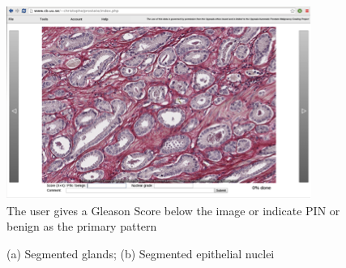 \documentclass[10pt, a4paper]{article}
\begin{document}
{\begin{enumerate}
\begin{figure}[!htbp]
	\centering
	\includegraphics[width=.6\textwidth]{figures/research/userinterfaceprostate.png}
	\caption{The user gives a Gleason Score below the image or indicate PIN or benign as the primary pattern} 
	\label{fig:userintpros}
\end{figure}

\begin{figure}[!htbp]
	\centering
	\caption{(a) Segmented glands; (b) Segmented epithelial nuclei}
	\label{fig:segglandpros}
\end{figure}


\newpage




\end{enumerate}}
\end{document}
